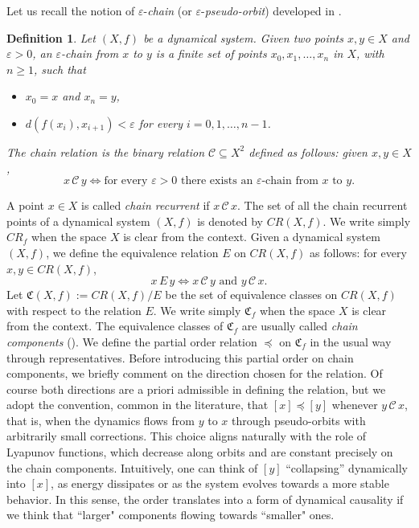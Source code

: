 \documentclass[pdflatex,sn-mathphys-num]{sn-jnl}
\theoremstyle{thmstyleone}%
\theoremstyle{thmstyletwo}%
\theoremstyle{thmstylethree}%
\newtheorem{defi}{Definition}%
\begin{document}
\noindent Let us recall the notion of $\varepsilon$-{\em chain} (or $\varepsilon$-{\em pseudo-orbit}) developed in \cite{co78}.
\begin{defi}\label{def_chain_rel}
Let $(X,f)$ be a dynamical system. Given two points $x,y\in X$ and $\varepsilon>0$, an $\varepsilon$-\emph{chain} from $x$ to $y$ is a finite set of points $x_0,x_1,\ldots,x_n$ in $X$, with $n\ge 1$, such that
\begin{itemize}
 \item[(i)] $x_0=x$ and $x_n=y$,
 \item[(ii)] $d(f(x_i),x_{i+1})<\varepsilon$ for every $i=0,1,\ldots, n-1$.
\end{itemize}
The {\it chain relation} is the binary relation $\mathcal{C}\subseteq X^2$ defined as follows: given $x,y\in X$, 
\[
x\,\mathcal{C}\, y\iff \text{for every $\varepsilon>0$ there exists an $\varepsilon$-chain from $x$ to $y$}.
\]
\end{defi}

\noindent A point $x\in X$ is called {\it chain recurrent} if $x\,\mathcal{C}\,x$. 
The set of all the chain recurrent points of a dynamical system $(X,f)$ is denoted by $CR(X,f)$.
We write simply $CR_f$ when the space $X$ is clear from the context.
Given a dynamical system $(X,f)$, we define the equivalence relation $E$ on $CR(X,f)$ as follows: for every $x,y\in CR(X,f)$,
\[
x\,E\,y\iff x\,\mathcal{C}\, y\text{ and }y\,\mathcal{C}\, x.
\]
Let $\mathfrak{C}(X,f):=CR(X,f)/E$ be the set of equivalence classes on $CR(X,f)$ with respect to the relation $E$. 
We write simply $\mathfrak{C}_f$ when the space $X$ is clear from the context.
The equivalence classes of $\mathfrak{C}_f$ are usually called \emph{chain components} (\cite[Def.~2.70]{kurka}). 
We define the partial order relation $\preceq$ on $\mathfrak{C}_f$ in the usual way through representatives. 
Before introducing this partial order on chain components, we briefly comment on the direction chosen for the relation. Of course both directions are a priori admissible in defining the relation, but we adopt the convention, common in the literature, that $[x] \preceq [y]$ whenever $y \,\mathcal{C}\, x$, that is, when the dynamics flows from $y$ to $x$ through pseudo-orbits with arbitrarily small corrections. 
This choice aligns naturally with the role of Lyapunov functions, which decrease along orbits and are constant precisely on the chain components. 
Intuitively, one can think of $[y]$ ``collapsing'' dynamically into $[x]$, as energy dissipates or as the system evolves towards a more stable behavior. 
In this sense, the order translates into a form of dynamical causality if we think that ``larger" components flowing towards ``smaller" ones. 
\end{document}
